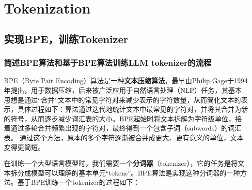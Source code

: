 \documentclass{article}
\begin{document}
\section{Tokenization}
\subsection{实现BPE，训练Tokenizer}
\subsubsection{简述BPE算法和基于BPE算法训练LLM tokenizer的流程}
BPE（Byte Pair Encoding）算法是一种\textbf{文本压缩算法}，最早由Philip Gage于1994年提出，用于数据压缩，后来被广泛应用于自然语言处理（NLP）任务，其基本思想是通过“合并”文本中的常见字符对来减少表示的字符数量，从而简化文本的表示，具体过程如下：算法通过迭代地统计文本中最常见的字符对，并将其合并为新的符号，从而逐步减少词汇表的大小。BPE起始时将文本拆解为字符级单位，接着通过多轮合并频繁出现的字符对，最终得到一个包含子词（subwords）的词汇表。
通过这个方法，原本的多个字符逐渐被合并成更大、更有意义的单位，文本变得更简短。

在训练一个大型语言模型时，我们需要一个\textbf{分词器}（tokenizer），它的任务是将文本拆分成模型可以理解的基本单元“tokens”。BPE算法是实现这种分词器的一种方法。基于BPE训练一个tokenizer的过程如下：
\end{document}
